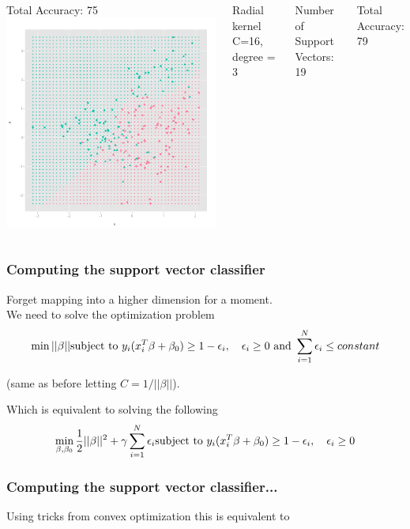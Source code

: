 \documentclass{beamer}
\begin{document}
\begin{frame}
\begin{columns}[c]
		Total Accuracy: 75 
		\includegraphics{polyb.png}
		
		Radial kernel C=16, degree = 3

		Number of Support Vectors:  19

		Total Accuracy: 79
	\end{columns}
\end{frame}


\nocite{Hastie:elementsStat:2001}
\nocite{Bishop}
\nocite{chen-tutorial}
\nocite{Hearst}
\nocite{Di}
\nocite{Raquel}
\frame{
\begin{tiny}


\end{tiny}
}


\begin{frame}
	\frametitle{Computing the support vector classifier}
	Forget mapping into a higher dimension for a moment.\\
	We need to solve the optimization problem
	\begin{equation*}
	\min ||\beta|| \\
	\text{subject to } y_i(x_i^T\beta + \beta_0) \ge 1- \epsilon_i, \quad  \epsilon_i\ge 0 \text{ and } \sum_{i=1}^N \epsilon_i \le constant
	\end{equation*}

	(same as before letting $C = 1/||\beta||$).

	Which is equivalent to solving the following
	\begin{equation*}
	\min_{\beta, \beta_0} \frac{1}{2}||\beta||^2 + \gamma \sum_{i=1}^N \epsilon_i \\
	\text{subject to } y_i(x_i^T\beta + \beta_0) \ge 1- \epsilon_i, \quad  \epsilon_i\ge 0 
	\end{equation*}
	\end{frame}

\begin{frame}
		\frametitle{Computing the support vector classifier...}
		Using tricks from convex optimization this is equivalent to 
		\begin{equation}
		
		\end{equation}
\end{frame}
\end{document}
